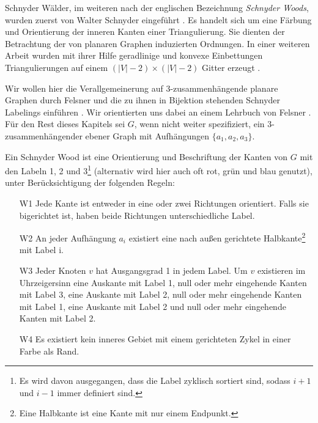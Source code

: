 Schnyder Wälder, im weiteren nach der englischen Bezeichnung \textit{Schnyder Woods}, wurden zuerst von Walter Schnyder eingeführt \cite{schnyder89}. Es handelt sich um eine Färbung und Orientierung der inneren Kanten einer Triangulierung. Sie dienten der Betrachtung der von planaren Graphen induzierten Ordnungen. In einer weiteren Arbeit wurden mit ihrer Hilfe geradlinige und konvexe Einbettungen Triangulierungen auf einem $(|V|-2)\times(|V|-2)$ Gitter erzeugt \cite{schnyder90}.

Wir wollen hier die Verallgemeinerung auf 3-zusammenhängende planare Graphen durch Felsner und die zu ihnen in Bijektion stehenden Schnyder Labelings einführen \cite{felsner01}. Wir orientierten uns dabei an einem Lehrbuch von Felsner \cite{felsner12}. Für den Rest dieses Kapitels sei $G$, wenn nicht weiter spezifiziert, ein 3-zusammenhängender ebener Graph mit Aufhängungen $\{a_1,a_2,a_3\}$.

\begin{definition}\label{def_sw}
Ein Schnyder Wood ist eine Orientierung und Beschriftung der Kanten von $G$ mit den Labeln 1, 2 und 3\footnote{Es wird davon ausgegangen, dass die Label zyklisch sortiert sind, sodass $i+1$ und $i-1$ immer definiert sind.} (alternativ wird hier auch oft rot, grün und blau genutzt), unter Berücksichtigung der folgenden Regeln:
\begin{itemize}
\item[W1] Jede Kante ist entweder in eine oder zwei Richtungen orientiert. Falls sie bigerichtet ist, haben beide Richtungen unterschiedliche Label.
\item[W2] An jeder Aufhängung  $a_i$ existiert eine nach außen gerichtete Halbkante\footnote{Eine Halbkante ist eine Kante mit nur einem Endpunkt.} mit Label i. 
\item[W3] Jeder Knoten $v$ hat Ausgangsgrad 1 in jedem Label. Um $v$ existieren im Uhrzeigersinn eine Auskante mit Label 1, null oder mehr eingehende Kanten mit Label 3, eine Auskante mit Label 2, null oder mehr  eingehende Kanten mit Label 1, eine Auskante mit Label 2 und null oder mehr  eingehende Kanten mit Label 2.
\item[W4] Es existiert kein inneres Gebiet mit einem gerichteten Zykel in einer Farbe als Rand.
\end{itemize}
\end{definition}

